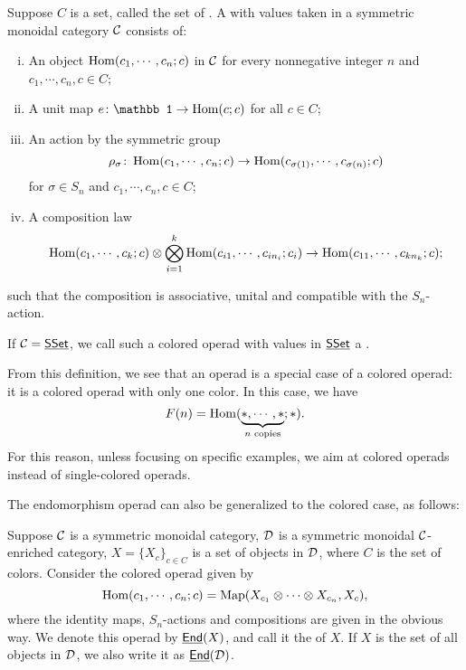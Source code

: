 \documentclass[twoside]{article}
\begin{document}
\begin{definition}
    Suppose $C$ is a set, called the set of . 
    A  with values taken in a symmetric monoidal category
    $\cal C$ consists of: 
    \begin{enumerate}[i)]
        \item An object $\operatorname{Hom}(c_1,\cdots,c_n;c)$ in $\cal C$ for every nonnegative integer $n$
        and $c_1,\cdots,c_n,c\in C$;
        \item A unit map $e\:\mathbb1\to\Hom(c;c)$ for all $c\in C$;
        \item An action by the symmetric group 
        \[\rho_\sigma\colon\operatorname{Hom}(c_1,\cdots,c_n;c)
        \to\operatorname{Hom}(c_{\sigma(1)},\cdots,c_{\sigma(n)};c)\] 
        for $\sigma\in S_n$ and $c_1,\cdots,c_n,c\in C$;
        \item A composition law \[\operatorname{Hom}(c_1,\cdots,c_k;c)\otimes\bigotimes\limits_{i=1}^k
        \operatorname{Hom}(c_{i1},\cdots,c_{in_i};c_i)\to\operatorname{Hom}(c_{11},\cdots,c_{kn_k};c);\]
    \end{enumerate}
    such that the composition is associative, unital and compatible
    with the $S_n$-action.

    If $\mathcal C=\underline{\smash{\mathsf{SSet}}}$, we call such a colored operad with values in $\underline{\smash{\mathsf{SSet}}}$
    a .
\end{definition}

From this definition, we see that an operad is a special case
of a colored operad: it is a colored operad with only one color.
In this case, we have 
\[F(n)=\operatorname{Hom}(\underbrace{*,\cdots,*}_{n\text{ copies}};*).\]
For this reason, unless focusing on specific examples, we aim at
colored operads instead of single-colored operads.

The endomorphism operad can also be generalized to the colored case,
as follows:

\begin{example}
    Suppose $\cal C$ is a symmetric monoidal category, $\cal D$ is a
    symmetric monoidal $\cal C$-enriched category, $X=\{X_c\}_{c\in C}$ is a set of objects
    in $\cal D$, where $C$ is the set of colors. Consider the colored operad given by
    \[\operatorname{Hom}(c_1,\cdots,c_n;c)=\operatorname{Map}(X_{c_1}\otimes\cdots\otimes X_{c_n},X_c),\]
    where the identity maps, $S_n$-actions and compositions are given in the obvious way.
    We denote this operad by $\underline{\mathsf{End}}(X)$, and call it the 
    of $X$. If $X$ is the set of all objects in $\cal D$, we also write it as
    $\underline{\mathsf{End}}(\cal D)$.
\end{example}
\end{document}
